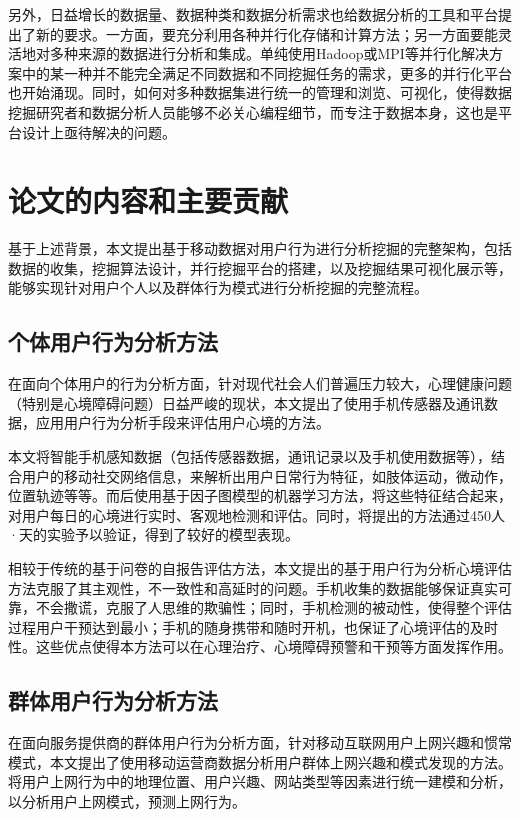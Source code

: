 另外，日益增长的数据量、数据种类和数据分析需求也给数据分析的工具和平台提出了新的要求。一方面，要充分利用各种并行化存储和计算方法；另一方面要能灵活地对多种来源的数据进行分析和集成。单纯使用Hadoop\cite{borthakur2007hadoop}或MPI\cite{gropp1999using}等并行化解决方案中的某一种并不能完全满足不同数据和不同挖掘任务的需求，更多的并行化平台也开始涌现\cite{engle2012shark}。同时，如何对多种数据集进行统一的管理和浏览、可视化，使得数据挖掘研究者和数据分析人员能够不必关心编程细节，而专注于数据本身，这也是平台设计上亟待解决的问题。

\section{论文的内容和主要贡献}
基于上述背景，本文提出基于移动数据对用户行为进行分析挖掘的完整架构，包括数据的收集，挖掘算法设计，并行挖掘平台的搭建，以及挖掘结果可视化展示等，能够实现针对用户个人以及群体行为模式进行分析挖掘的完整流程。

\subsection{个体用户行为分析方法}
在面向个体用户的行为分析方面，针对现代社会人们普遍压力较大，心理健康问题（特别是心境障碍问题）日益严峻的现状，本文提出了使用手机传感器及通讯数据，应用用户行为分析手段来评估用户心境的方法。

本文将智能手机感知数据（包括传感器数据，通讯记录以及手机使用数据等），结合用户的移动社交网络信息，来解析出用户日常行为特征，如肢体运动，微动作，位置轨迹等等。而后使用基于因子图模型的机器学习方法，将这些特征结合起来，对用户每日的心境进行实时、客观地检测和评估。同时，将提出的方法通过450人·天的实验予以验证，得到了较好的模型表现。

相较于传统的基于问卷的自报告评估方法，本文提出的基于用户行为分析心境评估方法克服了其主观性，不一致性和高延时的问题。手机收集的数据能够保证真实可靠，不会撒谎，克服了人思维的欺骗性；同时，手机检测的被动性，使得整个评估过程用户干预达到最小；手机的随身携带和随时开机，也保证了心境评估的及时性。这些优点使得本方法可以在心理治疗、心境障碍预警和干预等方面发挥作用。

\subsection{群体用户行为分析方法}
在面向服务提供商的群体用户行为分析方面，针对移动互联网用户上网兴趣和惯常模式，本文提出了使用移动运营商数据分析用户群体上网兴趣和模式发现的方法。将用户上网行为中的地理位置、用户兴趣、网站类型等因素进行统一建模和分析，以分析用户上网模式，预测上网行为。

